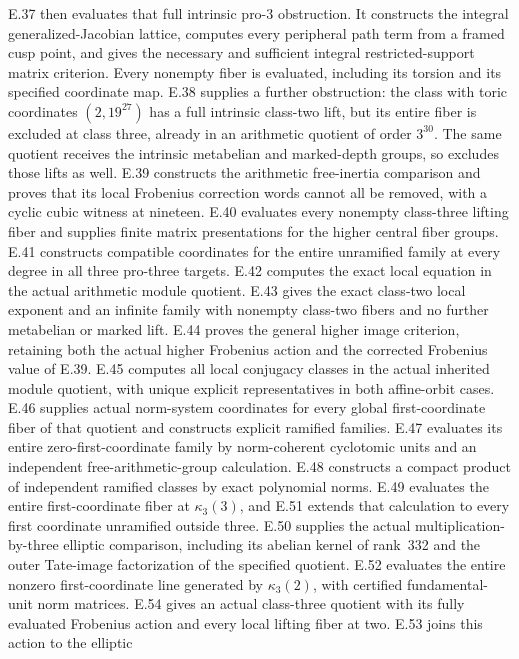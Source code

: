 E.37 then evaluates that full intrinsic pro-$3$ obstruction.
It constructs the integral generalized-Jacobian lattice,
computes every peripheral path term from a framed cusp
point, and gives the necessary and sufficient integral
restricted-support matrix criterion. Every nonempty fiber
is evaluated, including its torsion and its specified
coordinate map. E.38 supplies a further obstruction:
the class with toric coordinates $(2,19^{27})$ has a full
intrinsic class-two lift, but its entire fiber is excluded
at class three, already in an arithmetic quotient of
order $3^{30}$. The same quotient receives the intrinsic
metabelian and marked-depth groups, so excludes those
lifts as well.
E.39 constructs the arithmetic free-inertia comparison
and proves that its local Frobenius correction words
cannot all be removed, with a cyclic cubic witness at
nineteen. E.40 evaluates every nonempty class-three
lifting fiber and supplies finite matrix presentations
for the higher central fiber groups. E.41 constructs
compatible coordinates for the entire unramified family
at every degree in all three pro-three targets.
E.42 computes the exact local equation in the actual
arithmetic module quotient. E.43 gives the exact
class-two local exponent and an infinite family with
nonempty class-two fibers and no further metabelian
or marked lift. E.44 proves the general higher image
criterion, retaining both the actual higher Frobenius
action and the corrected Frobenius value of E.39.
E.45 computes all local conjugacy classes in the actual
inherited module quotient, with unique explicit
representatives in both affine-orbit cases.
E.46 supplies actual norm-system coordinates for every global
first-coordinate fiber of that quotient and constructs explicit
ramified families. E.47 evaluates its entire zero-first-coordinate
family by norm-coherent cyclotomic units and an independent
free-arithmetic-group calculation. E.48 constructs a compact
product of independent ramified classes by exact polynomial
norms. E.49 evaluates the entire first-coordinate fiber at
$\kappa_3(3)$, and E.51 extends that calculation to every
first coordinate unramified outside three. E.50 supplies
the actual multiplication-by-three elliptic comparison,
including its abelian kernel of rank~332 and the outer
Tate-image factorization of the specified quotient.
E.52 evaluates the entire nonzero first-coordinate line
generated by $\kappa_3(2)$, with certified fundamental-unit
norm matrices. E.54 gives an actual class-three quotient
with its fully evaluated Frobenius action and every local
lifting fiber at two. E.53 joins this action to the elliptic
